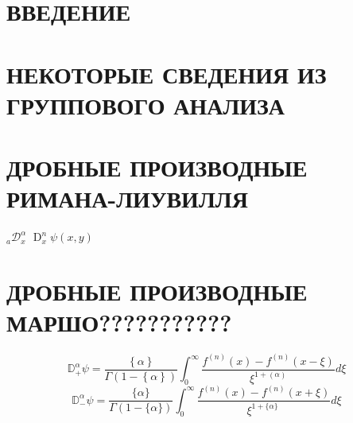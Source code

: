 \documentclass[a4paper, fontsize=14pt]{article}
\newcommand{\MD}[1]{\mathbb{D}_{#1}^{\alpha}} %
\newcommand{\RLD}[2]{{}_{#1}\mathcal{D}_{#2}^{\alpha}} %
\newcommand{\D}[2]{\operatorname{D}_{#1}^{#2}}
\begin{document}
\tableofcontents

\newpage
\section*{ВВЕДЕНИЕ}

\section[Некоторые сведения из группового анализа]{НЕКОТОРЫЕ СВЕДЕНИЯ ИЗ ГРУППОВОГО АНАЛИЗА}

\section[Дробные производные Римана-Лиувилля]{ДРОБНЫЕ ПРОИЗВОДНЫЕ РИМАНА-ЛИУВИЛЛЯ}
$\RLD{a}{x}$
$\D{x}{n} \psi(x, y)$


\section[Дробные производные Маршо]{ДРОБНЫЕ ПРОИЗВОДНЫЕ МАРШО???????????}

\begin{equation}
  \MD{ +} \psi=\frac{\left\{\alpha\right\}}{\Gamma(1-\left\{\alpha\right\})}\int_{0}^{\infty}\frac{f^{(n)}(x)-f^{(n)}(x-\xi)}{\xi^{1+\left(\alpha\right)}}d\xi
\end{equation}
\begin{equation}
  \MD{ -} \psi=\frac{\{\alpha\}}{\Gamma(1-\{\alpha\})}\int_{0}^{\infty}\frac{f^{(n)}(x)-f^{(n)}(x+\xi)}{\xi^{1+\{\alpha\}}\ } d\xi
\end{equation}
\end{document}
